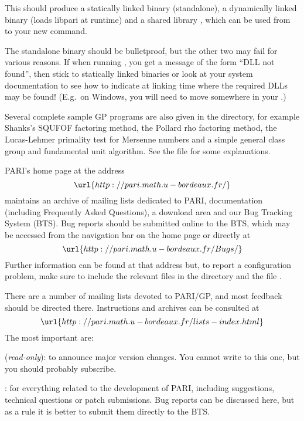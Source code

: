 This should produce a statically linked binary 
(standalone), a dynamically linked binary  (loads libpari
at runtime) and a shared library , which can be used from
 to  your new  command.

The standalone binary should be bulletproof, but the other two may fail
for various reasons. If when running , you get a message
of the form ``DLL not found'', then stick to statically linked binaries
or look at your system documentation to see how to indicate at linking
time where the required DLLs may be found! (E.g.~on Windows, you will
need to move  somewhere in your .)

 Several complete sample GP programs are also given in
the  directory, for example Shanks's SQUFOF factoring method,
the Pollard rho factoring method, the Lucas-Lehmer primality test for
Mersenne numbers and a simple general class group and fundamental unit
algorithm. See the file  for some explanations.

 PARI's home page at the address
$$\url{http://pari.math.u-bordeaux.fr/}$$
%
maintains an archive of mailing lists dedicated to PARI, documentation
(including Frequently Asked Questions), a download area and our Bug Tracking
System (BTS). Bug reports should be submitted online to the BTS, which may be
accessed from the navigation bar on the home page or directly at
$$\url{http://pari.math.u-bordeaux.fr/Bugs/}$$
%
Further information can be found at that address but, to report a
configuration problem, make sure to include the relevant  files in
the  directory and the file .
\smallskip

There are a number of mailing lists devoted to PARI/GP, and most feedback
should be directed there. Instructions and archives can be consulted at
$$ \url{http://pari.math.u-bordeaux.fr/lists-index.html} $$
%
The most important are:

\item {} (\emph{read-only}): to announce major version
changes. You cannot write to this one, but you should probably subscribe.

\item {}: for everything related to the development of PARI,
including suggestions, technical questions or patch submissions. Bug reports
can be discussed here, but as a rule it is better to submit them directly
to the BTS.

